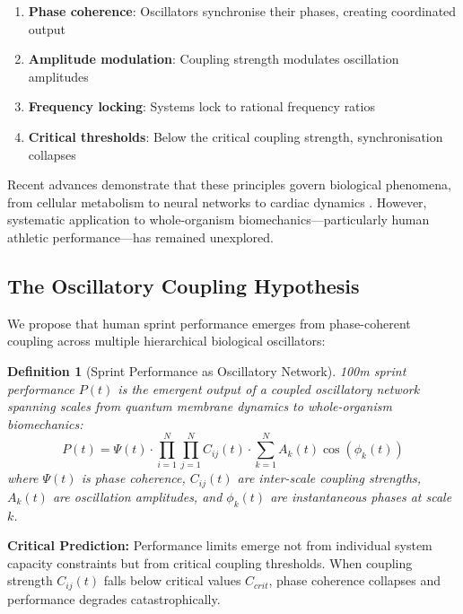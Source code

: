 \documentclass[10pt]{article}
\newtheorem{definition}{Definition}
\begin{document}
\begin{enumerate}
\item \textbf{Phase coherence}: Oscillators synchronise their phases, creating coordinated output
\item \textbf{Amplitude modulation}: Coupling strength modulates oscillation amplitudes
\item \textbf{Frequency locking}: Systems lock to rational frequency ratios
\item \textbf{Critical thresholds}: Below the critical coupling strength, synchronisation collapses
\end{enumerate}

Recent advances demonstrate that these principles govern biological phenomena, from cellular metabolism \citep{goldbeter2002computational} to neural networks \citep{buzsaki2006rhythms} to cardiac dynamics \citep{glass2001clocks}. However, systematic application to whole-organism biomechanics—particularly human athletic performance—has remained unexplored.

\subsection{The Oscillatory Coupling Hypothesis}

We propose that human sprint performance emerges from phase-coherent coupling across multiple hierarchical biological oscillators:

\begin{definition}[Sprint Performance as Oscillatory Network]
100m sprint performance $P(t)$ is the emergent output of a coupled oscillatory network spanning scales from quantum membrane dynamics to whole-organism biomechanics:
\begin{equation}
P(t) = \Psi(t) \cdot \prod_{i=1}^{N} \prod_{j=1}^{N} C_{ij}(t) \cdot \sum_{k=1}^{N} A_k(t) \cos(\phi_k(t))
\label{eq:performance_function}
\end{equation}
where $\Psi(t)$ is phase coherence, $C_{ij}(t)$ are inter-scale coupling strengths, $A_k(t)$ are oscillation amplitudes, and $\phi_k(t)$ are instantaneous phases at scale $k$.
\end{definition}

\textbf{Critical Prediction:} Performance limits emerge not from individual system capacity constraints but from critical coupling thresholds. When coupling strength $C_{ij}(t)$ falls below critical values $C_{crit}$, phase coherence collapses and performance degrades catastrophically.
\end{document}
